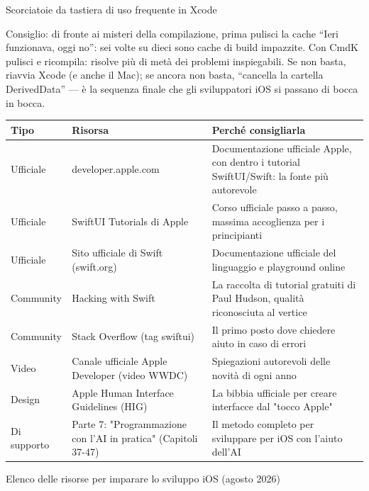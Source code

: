 \begin{center}\small\color{gray}Scorciatoie da tastiera di uso frequente in Xcode\end{center}

\begin{tcbinfo}{Consiglio: di fronte ai misteri della compilazione, prima pulisci la cache}
“Ieri funzionava, oggi no”: sei volte su dieci sono cache di build impazzite. Con CmdK pulisci e ricompila: risolve più di metà dei problemi inspiegabili. Se non basta, riavvia Xcode (e anche il Mac); se ancora non basta, “cancella la cartella DerivedData” — è la sequenza finale che gli sviluppatori iOS si passano di bocca in bocca.

\end{tcbinfo}



\begin{center}
\begin{tabularx}{\linewidth}{|X|X|X|}
\hline
\textbf{Tipo} & \textbf{Risorsa} & \textbf{Perché consigliarla} \tabularnewline
\hline
Ufficiale & developer.apple.com & Documentazione ufficiale Apple, con dentro i tutorial SwiftUI/Swift: la fonte più autorevole \tabularnewline
Ufficiale & SwiftUI Tutorials di Apple & Corso ufficiale passo a passo, massima accoglienza per i principianti \tabularnewline
Ufficiale & Sito ufficiale di Swift (swift.org) & Documentazione ufficiale del linguaggio e playground online \tabularnewline
Community & Hacking with Swift & La raccolta di tutorial gratuiti di Paul Hudson, qualità riconosciuta al vertice \tabularnewline
Community & Stack Overflow (tag swiftui) & Il primo posto dove chiedere aiuto in caso di errori \tabularnewline
Video & Canale ufficiale Apple Developer (video WWDC) & Spiegazioni autorevoli delle novità di ogni anno \tabularnewline
Design & Apple Human Interface Guidelines (HIG) & La bibbia ufficiale per creare interfacce dal "tocco Apple" \tabularnewline
Di supporto & Parte 7: "Programmazione con l'AI in pratica" (Capitoli 37-47) & Il metodo completo per sviluppare per iOS con l'aiuto dell'AI \tabularnewline
\hline
\end{tabularx}
\end{center}

\begin{center}\small\color{gray}Elenco delle risorse per imparare lo sviluppo iOS (agosto 2026)\end{center}


